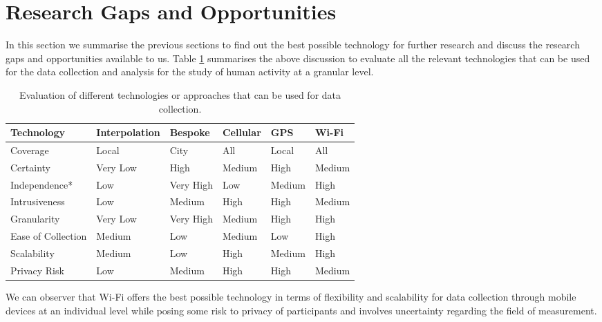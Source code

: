 \section{Research Gaps and Opportunities}

In this section we summarise the previous sections to find out the best possible  technology for further research and discuss the research gaps and opportunities available to us.
Table \ref{table:literature:technologies} summarises the above discussion to evaluate all the relevant technologies that can be used for the data collection and analysis for the study of human activity at a granular level.

\begin{table}
  \footnotesize
  \begin{center}
    \begin{tabular}{p{2.25cm}p{1.5cm}p{1.3cm}p{1.3cm}p{1.3cm}p{1.3cm}}
      \toprule
        Technology & Interpolation & Bespoke & Cellular & GPS & Wi-Fi \\
      \midrule
        Coverage & Local & City & All & Local & All\\
        \addlinespace[0.2cm]
        Certainty & Very Low & High & Medium & High & Medium \\
        \addlinespace[0.2cm]
        Independence* & Low & Very High & Low & Medium & High \\
        \addlinespace[0.2cm]
        Intrusiveness & Low & Medium & High & High & Medium \\
        \addlinespace[0.2cm]
        Granularity & Very Low & Very High & Medium & High & High \\
        \addlinespace[0.2cm]
        Ease of Collection & Medium & Low & Medium & Low & High \\
        \addlinespace[0.2cm]
        Scalability & Medium & Low & High & Medium & High \\
        \addlinespace[0.2cm]
        Privacy Risk & Low & Medium & High & High & Medium \\
      \bottomrule
    \end{tabular}
  \end{center}
  \caption{Evaluation of different technologies or approaches that can be used for data collection.}
  \label{table:literature:technologies}
\end{table}

We can observer that Wi-Fi offers the best possible technology in terms of flexibility and scalability for data collection through mobile devices at an individual level while posing some risk to privacy of participants and involves uncertainty regarding the field of measurement. 


